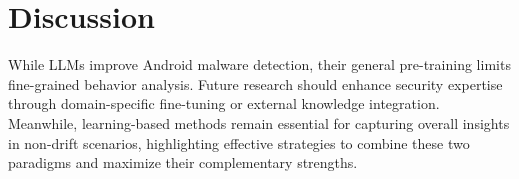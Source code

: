 \section{Discussion}
While LLMs improve Android malware detection, their general pre-training limits fine-grained behavior analysis. Future research should enhance security expertise through domain-specific fine-tuning or external knowledge integration. Meanwhile, learning-based methods remain essential for capturing overall insights in non-drift scenarios, highlighting effective strategies to combine these two paradigms and maximize their complementary strengths.
